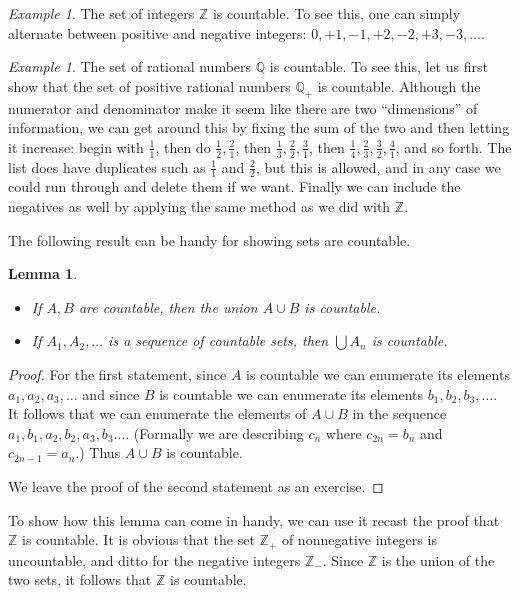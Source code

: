 \documentclass[11pt,oneside]{amsbook}
\newcommand{\Z}{\mathbb Z}
\newcommand{\Q}{\mathbb Q}
\theoremstyle{definition}
\theoremstyle{plain}
\newtheorem{lemma}[theorem]{Lemma}
\theoremstyle{definition}
\theoremstyle{remark}
\newtheorem{example}[theorem]{Example}
\numberwithin{equation}{section}
\numberwithin{figure}{section}
\begin{document}
\begin{example}
  The set of integers $\Z$ is countable. To see this, one can simply alternate between positive and negative integers: $0,+1,-1,+2,-2,+3,-3,\ldots$.
\end{example}

\begin{example}
  The set of rational numbers $\Q$ is countable. To see this, let us first show that the set of positive rational numbers $\Q_+$ is countable. Although the numerator and denominator make it seem like there are two ``dimensions'' of information, we can get around this by fixing the sum of the two and then letting it increase: begin with $\frac11$, then do $\frac12,\frac21$, then $\frac13,\frac22,\frac31$, then $\frac14,\frac23,\frac32,\frac41$, and so forth. The list does have duplicates such as $\frac11$ and $\frac22$, but this is allowed, and in any case we could run through and delete them if we want. Finally we can include the negatives as well by applying the same method as we did with $\Z$.
\end{example}

The following result can be handy for showing sets are countable.

\begin{lemma}
  \begin{itemize}
  \item If $A,B$ are countable, then the union $A\cup B$ is countable.
  \item If $A_1,A_2,\ldots$ is a sequence of countable sets, then $\bigcup A_n$ is countable.
  \end{itemize}
\end{lemma}

\begin{proof}
  For the first statement, since $A$ is countable we can enumerate its elements $a_1,a_2,a_3,\ldots$ and since $B$ is countable we can enumerate its elements $b_1,b_2,b_3,\ldots$. It follows that we can enumerate the elements of $A\cup B$ in the sequence $a_1,b_1,a_2,b_2,a_3,b_3\ldots$. (Formally we are describing $c_n$ where $c_{2n}=b_n$ and $c_{2n-1}=a_n$.) Thus $A\cup B$ is countable.

  We leave the proof of the second statement as an exercise.
\end{proof}

To show how this lemma can come in handy, we can use it recast the proof that $\Z$ is countable. It is obvious that the set $\Z_+$ of nonnegative integers is uncountable, and ditto for the negative integers $\Z_-$. Since $\Z$ is the union of the two sets, it follows that $\Z$ is countable.
\end{document}
